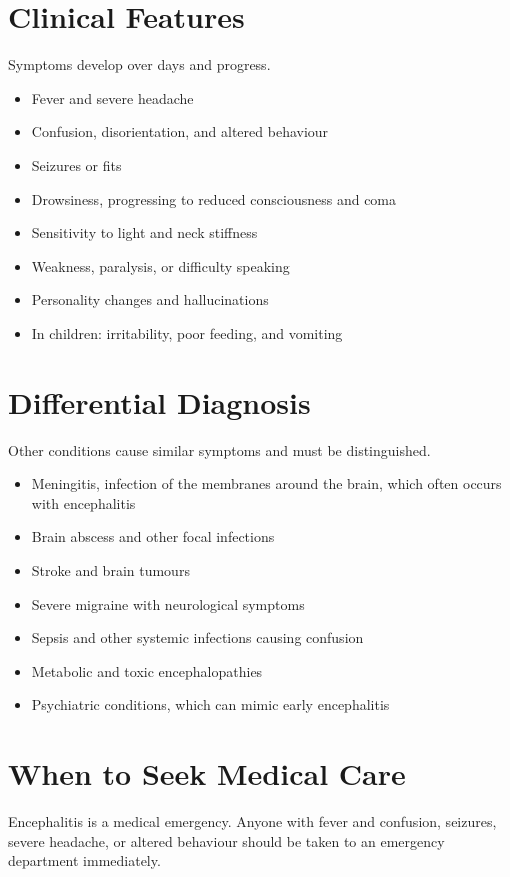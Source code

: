 \section*{Clinical Features}
Symptoms develop over days and progress.
\begin{itemize}
    \item Fever and severe headache
    \item Confusion, disorientation, and altered behaviour
    \item Seizures or fits
    \item Drowsiness, progressing to reduced consciousness and coma
    \item Sensitivity to light and neck stiffness
    \item Weakness, paralysis, or difficulty speaking
    \item Personality changes and hallucinations
    \item In children: irritability, poor feeding, and vomiting
\end{itemize}

\section*{Differential Diagnosis}
Other conditions cause similar symptoms and must be distinguished.
\begin{itemize}
    \item Meningitis, infection of the membranes around the brain, which often occurs with encephalitis
    \item Brain abscess and other focal infections
    \item Stroke and brain tumours
    \item Severe migraine with neurological symptoms
    \item Sepsis and other systemic infections causing confusion
    \item Metabolic and toxic encephalopathies
    \item Psychiatric conditions, which can mimic early encephalitis
\end{itemize}

\section*{When to Seek Medical Care}
Encephalitis is a medical emergency. Anyone with fever and confusion, seizures, severe headache, or altered behaviour should be taken to an emergency department immediately.

